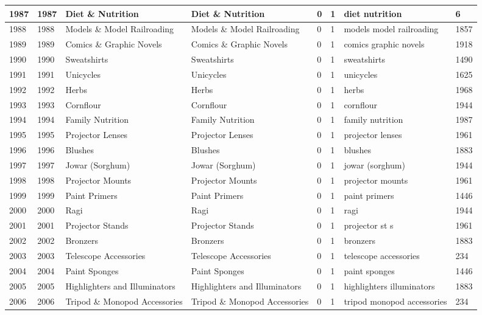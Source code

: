 \begin{longtable}{|l|l|l|l|l|l|l|l|}
1987 & 1987 & Diet \& Nutrition & Diet \& Nutrition & 0 & 1 & diet nutrition & 6 \\ \hline 
1988 & 1988 & Models \& Model Railroading & Models \& Model Railroading & 0 & 1 & models model railroading & 1857 \\ \hline 
1989 & 1989 & Comics \& Graphic Novels & Comics \& Graphic Novels & 0 & 1 & comics graphic novels & 1918 \\ \hline 
1990 & 1990 & Sweatshirts & Sweatshirts & 0 & 1 & sweatshirts & 1490 \\ \hline 
1991 & 1991 & Unicycles & Unicycles & 0 & 1 & unicycles & 1625 \\ \hline 
1992 & 1992 & Herbs & Herbs & 0 & 1 & herbs & 1968 \\ \hline 
1993 & 1993 & Cornflour & Cornflour & 0 & 1 & cornflour & 1944 \\ \hline 
1994 & 1994 & Family Nutrition & Family Nutrition & 0 & 1 & family nutrition & 1987 \\ \hline 
1995 & 1995 & Projector Lenses & Projector Lenses & 0 & 1 & projector lenses & 1961 \\ \hline 
1996 & 1996 & Blushes & Blushes & 0 & 1 & blushes & 1883 \\ \hline 
1997 & 1997 & Jowar (Sorghum) & Jowar (Sorghum) & 0 & 1 & jowar (sorghum) & 1944 \\ \hline 
1998 & 1998 & Projector Mounts & Projector Mounts & 0 & 1 & projector mounts & 1961 \\ \hline 
1999 & 1999 & Paint Primers & Paint Primers & 0 & 1 & paint primers & 1446 \\ \hline 
2000 & 2000 & Ragi & Ragi & 0 & 1 & ragi & 1944 \\ \hline 
2001 & 2001 & Projector Stands & Projector Stands & 0 & 1 & projector st s & 1961 \\ \hline 
2002 & 2002 & Bronzers & Bronzers & 0 & 1 & bronzers & 1883 \\ \hline 
2003 & 2003 & Telescope Accessories & Telescope Accessories & 0 & 1 & telescope accessories & 234 \\ \hline 
2004 & 2004 & Paint Sponges & Paint Sponges & 0 & 1 & paint sponges & 1446 \\ \hline 
2005 & 2005 & Highlighters and Illuminators & Highlighters and Illuminators & 0 & 1 & highlighters illuminators & 1883 \\ \hline 
2006 & 2006 & Tripod \& Monopod Accessories & Tripod \& Monopod Accessories & 0 & 1 & tripod monopod accessories & 234 \\ \hline 

\end{longtable}
